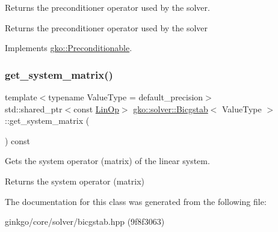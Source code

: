 Returns the preconditioner operator used by the solver. 

\begin{DoxyReturn}{Returns}
the preconditioner operator used by the solver 
\end{DoxyReturn}


Implements \hyperlink{classgko_1_1Preconditionable_ad9545089aef0dfc83bc7a74e5bf1d748}{gko\+::\+Preconditionable}.

\mbox{\label{classgko_1_1solver_1_1Bicgstab_ada73e8ca3e8924011c8780cab92f651e}} 
\subsubsection{\texorpdfstring{get\+\_\+system\+\_\+matrix()}{get\_system\_matrix()}}
{\footnotesize\ttfamily template$<$typename Value\+Type  = default\+\_\+precision$>$ \\
std\+::shared\+\_\+ptr$<$const \hyperlink{classgko_1_1LinOp}{Lin\+Op}$>$ \hyperlink{classgko_1_1solver_1_1Bicgstab}{gko\+::solver\+::\+Bicgstab}$<$ Value\+Type $>$\+::get\+\_\+system\+\_\+matrix (\begin{DoxyParamCaption}{ }\end{DoxyParamCaption}) const}



Gets the system operator (matrix) of the linear system. 

\begin{DoxyReturn}{Returns}
the system operator (matrix) 
\end{DoxyReturn}


The documentation for this class was generated from the following file\+:\begin{DoxyCompactItemize}
\item 
ginkgo/core/solver/bicgstab.\+hpp (9f8f3063)\end{DoxyCompactItemize}
